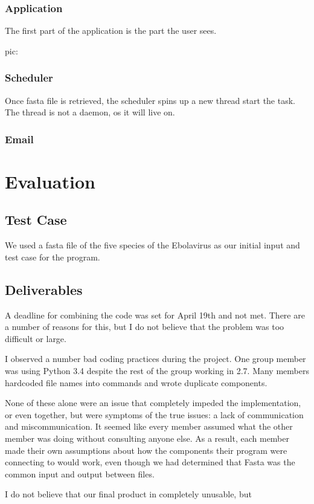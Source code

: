 \documentclass[10pt,letterpaper]{article}
\begin{document}
\subsubsection{Application}
The first part of the application is the part the user sees.

pic:



\subsubsection{Scheduler}


Once fasta file is retrieved, the scheduler spins up a new thread start the task. 
The thread is not a daemon, os it will live on.

\subsubsection{Email}




\section{Evaluation}

\subsection{Test Case}
We used a fasta file of the five species of the Ebolavirus as our initial input and test case for the program.

\subsection{Deliverables}
A deadline for combining the code was set for April 19th and not met.
There are a number of reasons for this, but I do not believe that the problem was too difficult or large.

I observed a number bad coding practices during the project.
One group member was using Python 3.4 despite the rest of the group working in 2.7.
Many members hardcoded file names into commands and wrote duplicate components.


None of these alone were an issue that completely impeded the implementation, or even together, but were symptoms of the true issues:   a lack of communication and miscommunication.
It seemed like every member assumed what the other member was doing without consulting anyone else.
As a result, each member made their own assumptions about how the components their program were connecting to would work, even though we had determined that Fasta was the common input and output between files.


I do  not believe that our final product in completely unusable, but 



\end{document}
